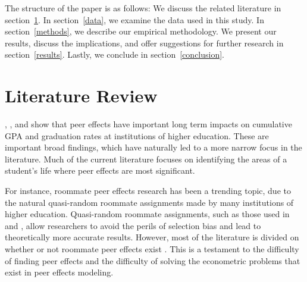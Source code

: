 \documentclass[12pt,letterpaper,english,fleqn,titlepage]{article}
\begin{document}
The structure of the paper is as follows: 
We discuss the related literature in section~\ref{litreview}. 
In section~\ref{data}, we examine the data used in this study. 
In section~\ref{methods}, we describe our empirical methodology.
We present our results, discuss the implications, and offer suggestions for further research in section~\ref{results}.
Lastly, we conclude in section~\ref{conclusion}.

\section{Literature Review}\label{litreview}

\citet{smith2015new}, \citet{luppino2015college}, and \citet{ost2010role} show that peer effects have important long term impacts on cumulative GPA and graduation rates at institutions of higher education.
These are important broad findings, which have naturally led to a more narrow focus in the literature.
Much of the current literature focuses on identifying the areas of a student's life where peer effects are most significant. 

For instance, roommate peer effects research has been a trending topic, due to the natural quasi-random roommate assignments made by many institutions of higher education.
Quasi-random roommate assignments, such as those used in \citet{griffith2014peer} and \citet{zimmerman2003peer}, allow researchers to avoid the perils of selection bias and lead to theoretically more accurate results.
However, most of the literature is divided on whether or not roommate peer effects exist \citep{griffith2014peer,zimmerman2003peer,sacerdote2000peer,foster2006s,mcewan2006roommate}.
This is a testament to the difficulty of finding peer effects and the difficulty of solving the econometric problems that exist in peer effects modeling.
\end{document}
